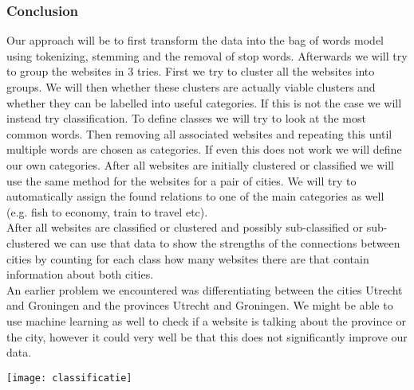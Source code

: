 \subsubsection{Conclusion}
Our approach will be to first transform the data into the bag of words model using tokenizing, stemming and the removal of stop words. Afterwards we will try to group the websites in 3 tries. First we try to cluster all the websites into groups. We will then whether these clusters are actually viable clusters and whether they can be labelled into useful categories. If this is not the case we will instead try classification. To define classes we will try to look at the most common words. Then removing all associated websites and repeating this until multiple words are chosen as categories. If even this does not work we will define our own categories.
After all websites are initially clustered or classified we will use the same method for the websites for a pair of cities. We will try to automatically assign the found relations to one of the main categories as well (e.g. fish to economy, train to travel etc). \\
After all websites are classified or clustered and possibly sub-classified or sub-clustered we can use that data to show the strengths of the connections between cities by counting for each class how many websites there are that contain information about both cities. \\
An earlier problem we encountered was differentiating between the cities Utrecht and Groningen and the provinces Utrecht and Groningen. We might be able to use machine learning as well to check if a website is talking about the province or the city, however it could very well be that this does not significantly improve our data.

\texttt{[image: classificatie]}